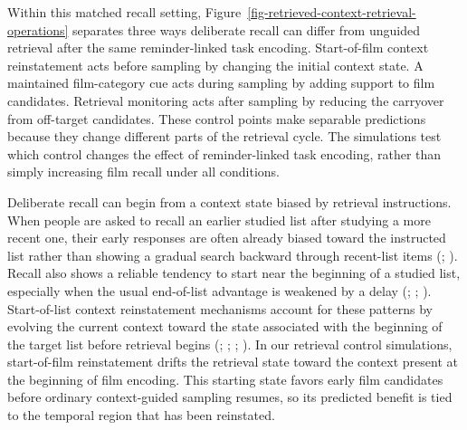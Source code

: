 \documentclass[
  man,
  floatsintext,
  longtable,
  nolmodern,
  notxfonts,
  notimes,
  draftfirst,
  colorlinks=true,linkcolor=blue,citecolor=blue,urlcolor=blue]{apa7}
\begin{document}
Within this matched recall setting,
Figure~\ref{fig-retrieved-context-retrieval-operations} separates three
ways deliberate recall can differ from unguided retrieval after the same
reminder-linked task encoding. Start-of-film context reinstatement acts
before sampling by changing the initial context state. A maintained
film-category cue acts during sampling by adding support to film
candidates. Retrieval monitoring acts after sampling by reducing the
carryover from off-target candidates. These control points make
separable predictions because they change different parts of the
retrieval cycle. The simulations test which control changes the effect
of reminder-linked task encoding, rather than simply increasing film
recall under all conditions.

Deliberate recall can begin from a context state biased by retrieval
instructions. When people are asked to recall an earlier studied list
after studying a more recent one, their early responses are often
already biased toward the instructed list rather than showing a gradual
search backward through recent-list items
(;
). Recall also
shows a reliable tendency to start near the beginning of a studied list,
especially when the usual end-of-list advantage is weakened by a delay
(;
;
).
Start-of-list context reinstatement mechanisms account for these
patterns by evolving the current context toward the state associated
with the beginning of the target list before retrieval begins
(;
;
;
). In our
retrieval control simulations, start-of-film reinstatement drifts the
retrieval state toward the context present at the beginning of film
encoding. This starting state favors early film candidates before
ordinary context-guided sampling resumes, so its predicted benefit is
tied to the temporal region that has been reinstated.
\end{document}
